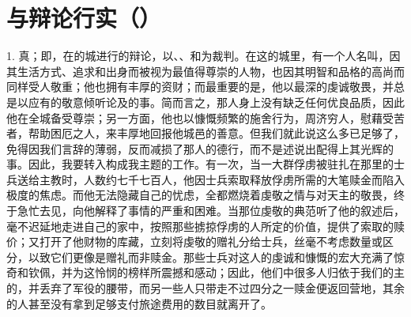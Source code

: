 
\chapter{与辩论行实（）}


1. 真；即，在的城进行的辩论，以、、和为裁判。在这的城里，有一个人名叫，因其生活方式、追求和出身而被视为最值得尊崇的人物，也因其明智和品格的高尚而同样受人敬重；他也拥有丰厚的资财；而最重要的是，他以最深的虔诚敬畏，并总是以应有的敬意倾听论及的事。简而言之，那人身上没有缺乏任何优良品质，因此他在全城备受尊崇；另一方面，他也以慷慨频繁的施舍行为，周济穷人，慰藉受苦者，帮助困厄之人，来丰厚地回报他城邑的善意。但我们就此说这么多已足够了，免得因我们言辞的薄弱，反而减损了那人的德行，而不是述说出配得上其光辉的事。因此，我要转入构成我主题的工作。有一次，当一大群俘虏被驻扎在那里的士兵送给主教时，人数约七千七百人，他因士兵索取释放俘虏所需的大笔赎金而陷入极度的焦虑。而他无法隐藏自己的忧虑，全都燃烧着虔敬之情与对天主的敬畏，终于急忙去见，向他解释了事情的严重和困难。当那位虔敬的典范听了他的叙述后，毫不迟延地走进自己的家中，按照那些掳掠俘虏的人所定的价值，提供了索取的赎价；又打开了他财物的库藏，立刻将虔敬的赠礼分给士兵，丝毫不考虑数量或区分，以致它们更像是赠礼而非赎金。那些士兵对这人的虔诚和慷慨的宏大充满了惊奇和钦佩，并为这怜悯的榜样所震撼和感动；因此，他们中很多人归依于我们的主的，并丢弃了军役的腰带，而另一些人只带走不过四分之一赎金便返回营地，其余的人甚至没有拿到足够支付旅途费用的数目就离开了。\par

